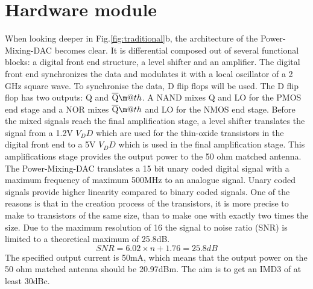 \makeatletter
\newcommand*{\textoverline}[1]{$\overline{\hbox{#1}}\m@th$}
\makeatother

\section{Hardware module}\label{sec:overview}
When looking deeper in Fig.\ref{fig:traditional}b, the architecture of the Power-Mixing-DAC becomes clear. It is differential composed out of several functional blocks: a digital front end structure, a level shifter and an amplifier. 
The digital front end synchronizes the data and modulates it with a local oscillator of a 2 GHz square wave. To synchronise the data, D flip flops will be used. The D flip flop has two outputs: Q and \textoverline{Q}. A NAND mixes Q and LO for the PMOS end stage and a NOR mixes \textoverline{Q} and LO for the NMOS end stage. Before the mixed signals reach the final amplification stage, a level shifter translates the signal from a 1.2V $V_DD$ which are used for the thin-oxide transistors in the digital front end to a 5V $V_DD$ which is used in the final amplification stage. This amplifications stage provides the output power to the 50 ohm matched antenna.
The Power-Mixing-DAC translates a 15 bit unary coded digital signal with a maximum frequency of maximum 500MHz to an analogue signal. Unary coded signals provide higher linearity compared to binary coded signals. One of the reasons is that in the creation process of the transistors, it is more precise to make to transistors of the same size, than to make one with exactly two times the size. Due to the maximum resolution of 16 the signal to noise ratio (SNR) is limited to a theoretical maximum of 25.8dB.
\begin{equation}\label{eq:SNR}{SNR = 6.02 \times n + 1.76 = 25.8 dB}\end{equation}
The specified output current is 50mA, which means that the output power on the 50 ohm matched antenna should be 20.97dBm. The aim is to get an IMD3 of at least 30dBc.
